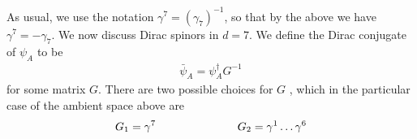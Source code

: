 \documentclass[12pt]{article}
\begin{document}
As usual, we use the notation $\gamma^7 = (\gamma_7)^{-1}$, so that by the above we have $\gamma^7 = - \gamma_7$. 
We now discuss Dirac spinors in $d=7$. We define the Dirac conjugate of $\psi_A$ to be 
\begin{eqnarray}
\bar \psi_A = \psi_A^\dagger G^{-1} 
\end{eqnarray}
for some matrix $G$. There are two possible choices for $G$ , which in the particular case of the ambient space above are 
\begin{eqnarray}
G_1 = \gamma^7 \hspace{1 in} G_2 = \gamma^1 \dots \gamma^6
\end{eqnarray}
\end{document}
